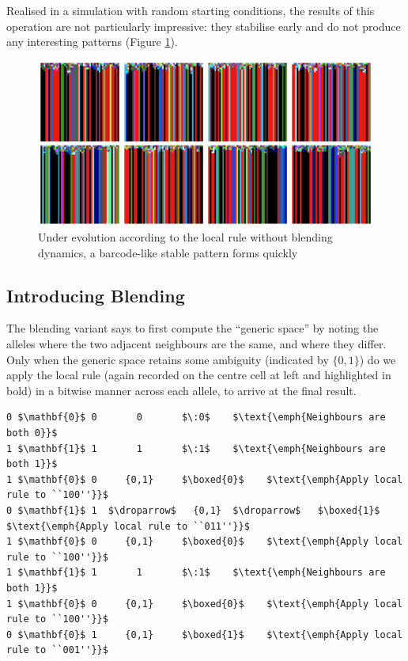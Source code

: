 \documentclass{AISB2008}
\makeatletter
\renewcommand{\boxed}[1]{\text{\fboxsep=.2em\fbox{\m@th$\displaystyle#1$}}}
\newcommand{\droparrow}{%
  \mathchoice{\raisebox{-4pt}{$\displaystyle\mapsto$}}
             {\raisebox{-4pt}{$\mapsto$}}
             {\raisebox{-2pt}{$\scriptstyle\mapsto$}}
             {\raisebox{-2pt}{$\scriptscriptstyle\mapsto$}}}
\makeatother
\begin{document}
Realised in a simulation with random starting conditions, the results
of this operation are not particularly impressive: they stabilise
early and do not produce any interesting patterns (Figure
\ref{barcode}).

\begin{figure}
\includegraphics[width=\columnwidth]{paint-drips2.png}
\caption{Under evolution according to the local rule without blending
  dynamics, a barcode-like stable pattern forms
  quickly\label{barcode}}
\end{figure}

\subsection{Introducing Blending} \label{introducing-blending}


The blending variant says to first compute the ``generic space'' by
noting the alleles where the two adjacent neighbours are the same, and
where they differ.  Only when the generic space retains some ambiguity
(indicated by $\{0,1\}$) do we apply the local rule (again recorded
on the centre cell at left and highlighted in bold) in a bitwise
manner across each allele, to arrive at the final result.

\lstset{
  xleftmargin=.05\columnwidth, xrightmargin=.01\columnwidth
}

\begin{lstlisting}[mathescape]
0 $\mathbf{0}$ 0       0       $\:0$    $\text{\emph{Neighbours are both 0}}$
1 $\mathbf{1}$ 1       1       $\:1$    $\text{\emph{Neighbours are both 1}}$
1 $\mathbf{0}$ 0     {0,1}     $\boxed{0}$    $\text{\emph{Apply local rule to ``100''}}$
0 $\mathbf{1}$ 1  $\droparrow$   {0,1}  $\droparrow$   $\boxed{1}$    $\text{\emph{Apply local rule to ``011''}}$
1 $\mathbf{0}$ 0     {0,1}     $\boxed{0}$    $\text{\emph{Apply local rule to ``100''}}$
1 $\mathbf{1}$ 1       1       $\:1$    $\text{\emph{Neighbours are both 1}}$
1 $\mathbf{0}$ 0     {0,1}     $\boxed{0}$    $\text{\emph{Apply local rule to ``100''}}$
0 $\mathbf{0}$ 1     {0,1}     $\boxed{1}$    $\text{\emph{Apply local rule to ``001''}}$
\end{lstlisting}
\end{document}
